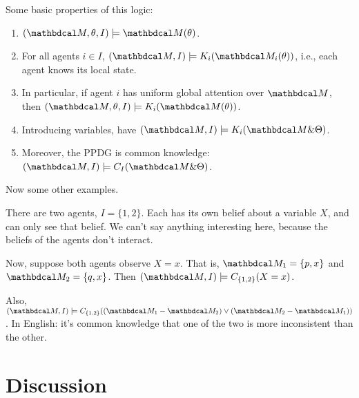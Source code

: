 {%

Some basic properties of this logic:
\begin{prop}
    \begin{enumerate}[parsep=0pt]
    \item $ (\dg M, \theta, I) \models \dg M(\theta)$.
    \item For all agents $i \in I$, 
        $(\dg M, I) \models K_i ( \dg M_i(\theta) )$, i.e., each agent
            knows its local state. 
    \item In particular, if agent $i$ has uniform global attention over $\dg M$, then 
        $(\dg M, \theta, I) \models K_i (\dg M(\theta))$.
    \item Introducing variables,  have $(\dg M, I) \models K_i (\dg M \& \Theta)$.
    \item Moreover, the PPDG is common knowledge: $(\dg M, I) \models C_{I} (\dg M \& \Theta)$.
    \end{enumerate}
\end{prop}


Now some other examples. 

\begin{example}
    There are two agents, $I = \{1,2\}$. Each has its own belief
    about a variable $X$, and can only see that belief. 
    We can't say anything interesting here, because the beliefs
    of the agents don't interact.
    
    Now, suppose both agents observe $X=x$. That is, $\dg M_1 = \{p, x\}$
    and $\dg M_2 = \{q, x\}$. Then  $(\dg M, I) \models C_{\{1,2\}}(X=x)$. 
    
    Also, $(\dg M, I) \models C_{\{1,2\}}( (\dg M_1 - \dg M_2) \lor (\dg M_2 -\dg M_1))$.
    In English: it's common knowledge that one of the two is more inconsistent than the other.
\end{example}

}%

\section{Discussion}

